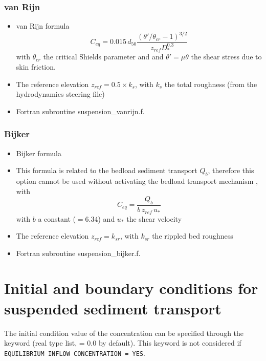 \subsubsection{van Rijn}
\begin{itemize}
\item van Rijn formula~\cite{vanRijn84b} 
\begin{equation*}
C_{eq} =0.015\,d_{50}\frac{\left(\theta'/\theta_{cr}-1\right)^{3/2}}{z_{ref}D_*^{0.3}}
\end{equation*}
with $\theta_{cr}$ the critical Shields parameter and and $\theta'= \mu\theta$ the shear stress due to skin friction.
\item The reference elevation $z_{ref}=0.5 \times k_s$, with $k_s$ the total roughness (from the hydrodynamics steering file)
\item Fortran subroutine {\ttfamily suspension\_vanrijn.f}.
\end{itemize}

\subsubsection{Bijker}
\begin{itemize}
\item Bijker formula 
\item This formula is related to the bedload sediment transport $Q_b$, therefore this option cannot be used without activating the bedload transport mechanism , with 
\begin{equation*}
C_{eq} =\frac{Q_b}{b\,z_{ref}\,u_*}
\end{equation*}
with $b$ a constant ($=6.34$) and $u_*$ the shear velocity
\item The reference elevation $z_{ref}=k_{sr}$, with $k_{sr}$ the rippled bed roughness 
\item Fortran subroutine {\ttfamily suspension\_bijker.f}.
\end{itemize}

\section{Initial and boundary conditions for suspended sediment transport}
The initial condition value of the concentration can be specified through the keyword  (real type list, {\ttfamily = 0.0} by default). This keyword is not considered if \texttt{EQUILIBRIUM INFLOW CONCENTRATION = YES}.\\

